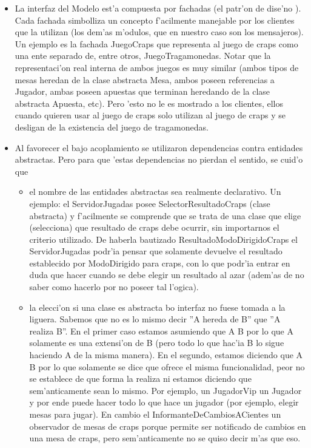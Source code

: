 \begin{itemize}
\item La interfaz del Modelo est'a compuesta por fachadas (el patr'on de dise'no ). Cada fachada simbolliza un concepto f'acilmente manejable por los clientes que la utilizan (los dem'as m'odulos, que en nuestro caso son los mensajeros). Un ejemplo es la fachada JuegoCraps que representa al juego de craps como una ente separado de, entre otros, JuegoTragamonedas. Notar que la representaci'on real interna de ambos juegos es muy similar (ambos tipos de mesas heredan de la clase abstracta Mesa, ambos poseen referencias a Jugador, ambas poseen apuestas que terminan heredando de la clase abstracta Apuesta, etc). Pero 'esto no le es mostrado a los clientes, ellos cuando quieren usar al juego de craps solo utilizan al juego de craps y se desligan de la existencia del juego de tragamonedas.
\item Al favorecer el bajo acoplamiento se utilizaron dependencias contra entidades abstractas. Pero para que 'estas dependencias no pierdan el sentido, se cuid'o que
	\begin{itemize}
	\item el nombre de las entidades abstractas sea realmente declarativo. Un ejemplo: el ServidorJugadas posee SelectorResultadoCraps (clase abstracta) y f'acilmente se comprende que se trata de una clase que elige (selecciona) que resultado de craps debe ocurrir, sin importarnos el criterio utilizado. De haberla bautizado ResultadoModoDirigidoCraps el ServidorJugadas podr'ia pensar que solamente devuelve el resultado establecido por ModoDirigido para craps, con lo que podr'ia entrar en duda que hacer cuando se debe elegir un resultado al azar (adem'as de no saber como hacerlo por no poseer tal l'ogica).
	\item la elecci'on si una clase es abstracta bo interfaz no fuese tomada a la liguera. Sabemos que no es lo mismo decir ''A hereda de B'' que ''A realiza B''. En el primer caso estamos asumiendo que A  B por lo que A solamente es una extensi'on de B (pero todo lo que hac'ia B lo sigue haciendo A de la misma manera). En el segundo, estamos diciendo que A  B por lo que solamente se dice que ofrece el misma funcionalidad, peor no se establece de que forma la realiza ni estamos diciendo que sem'anticamente sean lo mismo. Por ejemplo, un JugadorVip  un Jugador y por ende puede hacer todo lo que hace un jugador (por ejemplo, elegir mesas para jugar). En cambio el InformanteDeCambiosACientes  un observador de mesas de craps porque permite ser notificado de cambios en una mesa de craps, pero sem'anticamente no se quiso decir m'as que eso. 

\end{itemize}
\end{itemize}
